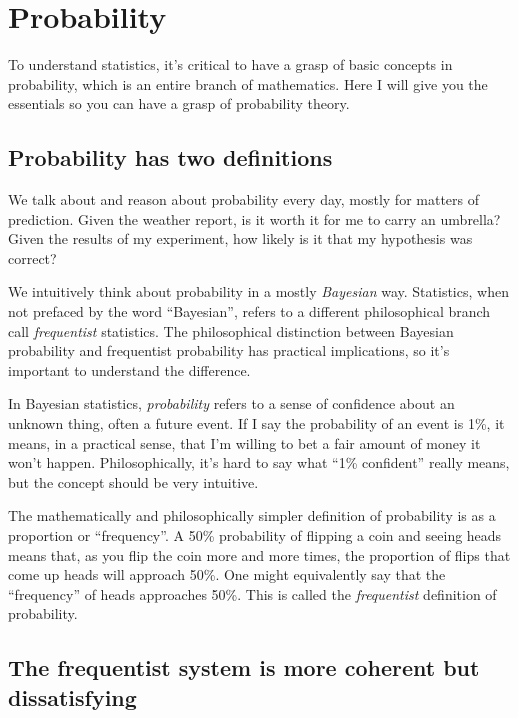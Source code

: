
\chapter{Probability}
\label{chapter:probability}

To understand statistics, it's critical to have a grasp of basic concepts in
probability, which is an entire branch of mathematics. Here I will give you
the essentials so you can have a grasp of probability theory.

\section{Probability has two definitions}

We talk about and reason about probability every day, mostly for matters of
prediction. Given the weather report, is it worth it for me to carry an
umbrella? Given the results of my experiment, how likely is it that my
hypothesis was correct?

We intuitively think about probability in a mostly \emph{Bayesian} way.
Statistics, when not prefaced by the word ``Bayesian'', refers to a different
philosophical branch call \emph{frequentist} statistics. The philosophical
distinction between Bayesian probability and frequentist probability has
practical implications, so it's important to understand the difference.

In Bayesian statistics, \emph{probability} refers to a sense of confidence
about an unknown thing, often a future event. If I say the probability of an
event is 1\%, it means, in a practical sense, that I'm willing to bet a fair
amount of money it won't happen. Philosophically, it's hard to say what ``1\%
confident'' really means, but the concept should be very intuitive.

The mathematically and philosophically simpler definition of probability is as
a proportion or ``frequency''. A 50\% probability of flipping a coin and seeing
heads means that, as you flip the coin more and more times, the proportion of
flips that come up heads will approach 50\%. One might equivalently say that
the ``frequency'' of heads approaches 50\%. This is called the
\emph{frequentist} definition of probability.


\section{The frequentist system is more coherent but dissatisfying}

